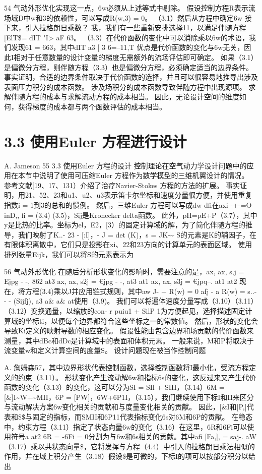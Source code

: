 \documentclass[UTF8,11pt,a4paper,openany,fontset=fandol]{ctexbook}
\begin{document}
54 气动外形优化实现这一点，6w必须从上述等式中剔除。 假设控制方程R表示流场域D中w和3的依赖性，可以写成R(w,3) = 0。 （3.1）然后从方程中确定6w 接下来，引入拉格朗日乘数？ 我，我们有一些重新安排选择11，以满足伴随方程 [ElT\$= dIT "I> aF 63。 （3.3）在代价函数的变化中可以消除乘以6w的术语，我们发现61 = 663，其中dIT a3 [ 3 6=--11,T 优点是代价函数的变化与6w无关，因此I相对于任意数量的设计变量的梯度无需额外的流场评估即可确定。 如果（3.1）是偏微分方程，则伴随方程（3.3）也是偏微分方程，必须确定适当的边界条件。 事实证明，合适的边界条件取决于代价函数的选择，并且可以很容易地推导出涉及表面压力积分的成本函数。 涉及场积分的成本函数导致伴随方程中出现源项。 求解伴随方程的成本与求解流动方程的成本相当。 因此，无论设计空间的维度如何，获得梯度的成本都与两个函数评估的成本相当。

\section{3.3 使用Euler 方程进行设计}
A. Jameson 55 3.3 使用Euler 方程的设计 控制理论在空气动力学设计问题中的应用在本节中说明了使用可压缩Euler 方程作为数学模型的三维机翼设计的情况。 参考文献[19、17、131）介绍了治疗Navier-Stokes 方程的方法的扩展。 事实证明，用21、52、23和u1、u2、u3表示笛卡尔坐标和速度分量很方便，并使用重复指数i = 1到3的总和的惯例。 然后，三维Euler 方程可以写成dw dfi在axi -+-=O inD,, fi = (3.4) (3.5)，Sij是Kronecker delta函数。 此外，pH=pE+P（3.7），其中y是比热的比率。坐标为el，E2，[3）的固定计算域的解，为了简化伴随方程的推导，我们映射了K..- 23 - [:I]，- J = det (K)，s = JK-\textasciitilde{} S的元素是K的辅因子，在有限体积离散中，它们只是投影在xi、22和23方向的计算单元的表面区域。 使用排列张量Eijk，我们可以将S的元素表示为

56 气动外形优化 在随后分析形状变化的影响时，需要注意的是，ax, ax, s,j = Ejpg - -, 862 at3 ax, ax, s2j = €jpg - -, at3 at1 ax, ax, s3j = €jpq--. at1 at2 现在，将方程(3.4)乘以J并应用链式规则，其中aw J- + R(w) = 0 afj - a R(w) = s..- - - (Sijfj), a3 a\& a\& at使用（3.9)。 我们可以将遍体速度分量写成（3.10）（3.11）（3.12）变换通量，以缩放的con- r puiu1 + SilP 1为方便起见，选择描述固定计算域的坐标ti，以便每个边界都符合这些坐标之一的常数值。 然后，形状的变化会导致Ki定义的映射导数的相应变化。 假设性能由包含边界和场贡献的代价函数来测量，其中dBc和dDc是计算域中的表面和体积元素。 一般来说，M和P将取决于流变量w和定义计算空间的度量S。 设计问题现在被当作控制问题

A. 詹姆森57，其中边界形状代表控制函数，选择控制函数将I最小化，受流方程定义的约束（3.11）。 形状变化产生流动解6w和指标6s的变化，这反过来又产生代价函数的变化（3.13）的变化，这可以分为SI = SIl + SIII，（3.14）6M = [\&]I\textasciitilde{}W+\textasciitilde{}MII，6P = [PW]，6W+6P1I，（3.15），我们继续使用下标I和II来区分与流动解决方案6w变化相关的贡献和与度量变化相关的贡献。 因此，[\&I和[P,]代表和\$\$与固定的指标，而SMII和6P11代表指标变化6s对6M和6P的贡献。 在稳态中，约束方程（3.11）指定了状态向量6w的变化（3.16）在这里，6R和6Fi可以使用符号a at2 6R = -6Fi = 0分割为与6w和6s相关的贡献。其中afi [Fa,], = saj-. aW（3.17）乘以共状态向量\$，它将发挥与方程（4.4）中引入的拉格朗日乘法相似的作用，并在域上积分产生（3.18）假设\$是可微的，下标I的项可以按部分积分以给出
\end{document}
